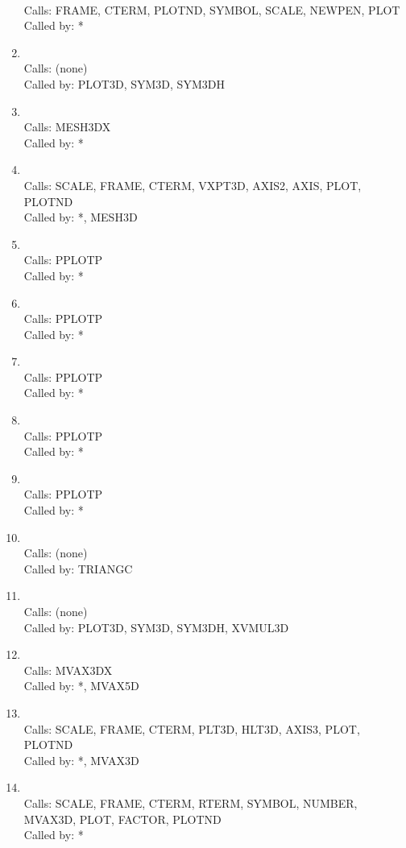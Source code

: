 \documentclass[11pt]{report}
\begin{document}
\begin{enumerate}
\\ Calls:  FRAME, CTERM, PLOTND, SYMBOL, SCALE, NEWPEN, PLOT
\\ Called by: *
\item {}
\\ Calls:  (none)
\\ Called by: PLOT3D, SYM3D, SYM3DH
\item {}
\\ Calls:  MESH3DX
\\ Called by: *
\item {}
\\ Calls:  SCALE, FRAME, CTERM, VXPT3D, AXIS2, AXIS, PLOT, PLOTND
\\ Called by: *, MESH3D
\item {}
\\ Calls:  PPLOTP
\\ Called by: *
\item {}
\\ Calls:  PPLOTP
\\ Called by: *
\item {}
\\ Calls:  PPLOTP
\\ Called by: *
\item {}
\\ Calls:  PPLOTP
\\ Called by: *
\item {}
\\ Calls:  PPLOTP
\\ Called by: *
\item {}
\\ Calls:  (none)
\\ Called by: TRIANGC
\item {}
\\ Calls:  (none)
\\ Called by: PLOT3D, SYM3D, SYM3DH, XVMUL3D
\item {}
\\ Calls:  MVAX3DX
\\ Called by: *, MVAX5D
\item {}
\\ Calls:  SCALE, FRAME, CTERM, PLT3D, HLT3D, AXIS3, PLOT, PLOTND
\\ Called by: *, MVAX3D
\item {}
\\ Calls:  SCALE, FRAME, CTERM, RTERM, SYMBOL, NUMBER, MVAX3D, PLOT,
FACTOR, PLOTND
\\ Called by: *

\end{enumerate}
\end{document}
